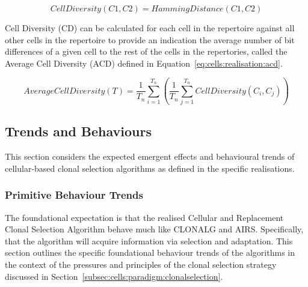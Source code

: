 \begin{equation}
	CellDiversity(C1, C2) = HammingDistance(C1, C2)
	\label{eq:cells:realisation:cd}
\end{equation}

Cell Diversity (CD) can be calculated for each cell in the repertoire against all other cells in the repertoire to provide an indication the average number of bit differences of a given cell to the rest of the cells in the repertories, called the Average Cell Diversity (ACD) defined in Equation~\ref{eq:cells:realisation:acd}.

\begin{equation}
	AverageCellDiversity(T) = \frac{1}{T_n}\sum_{i=1}^{T_n} \left(\frac{1}{T_n}\sum_{j=1}^{T_n} CellDiversity(C_i, C_j)\right) 	
	\label{eq:cells:realisation:acd}
\end{equation}


%
%
\subsection{Trends and Behaviours}
\label{sec:cells:realised:trends}
This section considers the expected emergent effects and behavioural trends of cellular-based clonal selection algorithms as defined in the specific realisations.

%
%
\subsubsection{Primitive Behaviour Trends}
The foundational expectation is that the realised Cellular and Replacement Clonal Selection Algorithm behave much like CLONALG and AIRS. Specifically, that the algorithm will acquire information via selection and adaptation. This section outlines the specific foundational behaviour trends of the algorithms in the context of the pressures and principles of the clonal selection strategy discussed in Section~\ref{subsec:cells:paradigm:clonalselection}.

